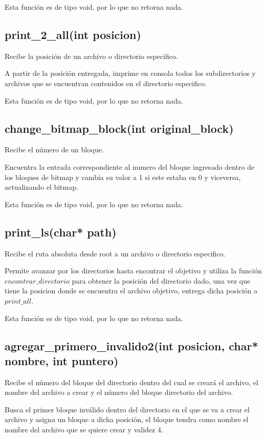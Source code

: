 \documentclass[12pt]{article}
\begin{document}
Esta función es de tipo void, por lo que no retorna nada.

\subsection{print\_2\_all(int posicion)}
Recibe la posición de un archivo o directorio especifico.

A partir de la posición entregada, imprime en consola todos los subdirectorios y archivos que se encuentran contenidos en el directorio especifico.

Esta función es de tipo void, por lo que no retorna nada.

\subsection{change\_bitmap\_block(int original\_block)}
Recibe el número de un bloque.

Encuentra la entrada correspondiente al numero del bloque ingresado dentro de los bloques de bitmap y cambia su valor a 1 si este estaba en 0 y viceversa, actualizando el bitmap.

Esta función es de tipo void, por lo que no retorna nada.

\subsection{print\_ls(char* path)}
Recibe el ruta absoluta desde root a un archivo o directorio especifico.

Permite avanzar por los directorios hasta encontrar el objetivo y utiliza la función $encontrar\_directorio$ para obtener la posición del directorio dado, una vez que tiene la posicion donde se encuentra el archivo objetivo, entrega dicha posición a $print\_all$.

Esta función es de tipo void, por lo que no retorna nada.

\subsection{agregar\_primero\_invalido2(int posicion, char* nombre, int puntero)}
Recibe el número del bloque del directorio dentro del cual se creará el archivo, el nombre del archivo a crear y el número del bloque directorio del archivo.

Busca el primer bloque inválido dentro del directorio en el que se va a crear el archivo y asigna un bloque a dicha posición, el bloque tendra como nombre el nombre del archivo que se quiere crear y validez 4.
\end{document}
